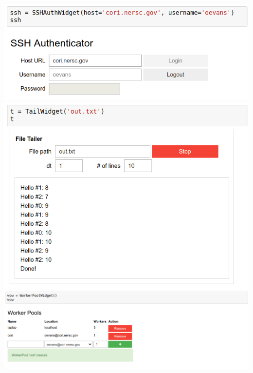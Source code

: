 \documentclass{tikzposter}
\begin{document}
\begin{columns}
{}
 {
    \includegraphics[width=\linewidth]{../img/screenshot/ssh_auth}
}
 {
    \includegraphics[width=\linewidth]{../img/screenshot/tail}
}
 {
    \includegraphics[width=\linewidth]{../img/screenshot/worker_pool}
}

% 


\end{columns}
\end{document}
